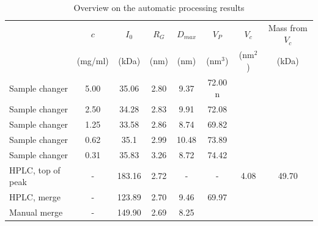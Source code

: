 \documentclass[preprint,pdf]{iucr}              %
\begin{document}
\begin{table}
\begin{tabular}{ l c | c c c c c c }
   & $c$  & $I_{0}$  & $R_{G}$ & $D_{max}$ & $V_{P}$ & $V_{c}$ & Mass from $V_{c}$\\
	 &  (mg/ml) & (kDa) & (nm)&  (nm)&  (nm$^{3}$) & (nm$^{2}$) & (kDa)\\
\hline
Sample changer & 5.00  & 35.06 & 2.80 & 9.37  & 72.00 n& &  \\
Sample changer & 2.50  & 34.28 & 2.83  & 9.91  & 72.08 & &  \\
Sample changer & 1.25 & 33.58& 2.86  & 8.74  & 69.82 & &  \\
Sample changer & 0.62  & 35.1& 2.99  & 10.48 & 73.89 & &  \\
Sample changer & 0.31 & 35.83  & 3.26  & 8.72  & 74.42& &  \\
HPLC, top of peak & - & 183.16 & 2.72  & -  & - & 4.08 & 49.70 \\
HPLC, merge & - & 123.89 & 2.70  & 9.46 & 69.97 & &  \\
Manual merge & - &  149.90 & 2.69 & 8.25 & & &  \\
\end{tabular}
\caption{Overview on the automatic processing results }
\label{tbl:results}
\end{table}
\end{document}
